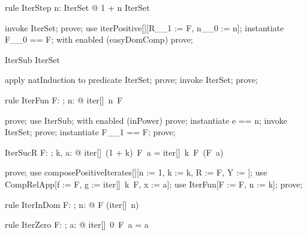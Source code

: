 \documentclass{article}
\begin{document}
\begin{theorem}{rule IterStep}
  \forall n: IterSet @ 1 + n \in IterSet
\end{theorem}

\begin{zproof}
invoke IterSet;
prove;
use iterPositive[\nat][R\_\_1 := F, n\_\_0 := n];
instantiate F\_\_0 == F;
with enabled (easyDomComp) prove;
\end{zproof}

\begin{theorem}{IterSub}
  \nat \subseteq IterSet
\end{theorem}

\begin{zproof}
apply natInduction to predicate \nat \subseteq IterSet;
prove;
invoke IterSet;
prove;
\end{zproof}

\begin{theorem}{rule IterFun}
  \forall F: \nat \fun \nat; n: \nat @ iter[\nat]~n~F \in \nat \fun \nat
\end{theorem}

\begin{zproof}
prove;
use IterSub;
with enabled (inPower) prove;
instantiate e == n;
invoke IterSet;
prove;
instantiate F\_\_1 == F;
prove;
\end{zproof}

\begin{theorem}{IterSucR}
  \forall F: \nat \fun \nat; k, a: \nat @ iter[\nat]~(1 + k)~F~a = iter[\nat]~k~F~(F~a)
\end{theorem}

\begin{zproof}
prove;
use composePositiveIterates[\nat][n := 1, k := k, R := F, Y := \nat];
use CompRelApp[f := F, g := iter[\nat]~k~F, x := a];
use IterFun[F := F, n := k];
prove;
\end{zproof}

\begin{theorem}{rule IterInDom}
  \forall F: \nat \fun \nat; n: \nat @ F \in \dom (iter[\nat]~n)
\end{theorem}


\begin{theorem}{rule IterZero}
  \forall F: \nat \fun \nat; a: \nat @ iter[\nat]~0~F~a = a
\end{theorem}
\end{document}
